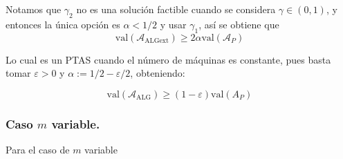 \documentclass[10pt]{article}
\newcommand{\val}[1]{\text{val}(#1)}
\theoremstyle{plain}
\theoremstyle{definition}
\begin{document}
Notamos que $\gamma_2$ no es una solución factible cuando se considera $\gamma \in (0,1)$, y entonces la única opción es $\alpha < 1/2$ y usar $\gamma_1$, así se obtiene que
$$
\val{\mathcal{A}_{\text{ALGext}}} \geq 2\alpha \val{\mathcal{A}_P}
$$

Lo cual es un PTAS cuando el número de máquinas es constante, pues basta tomar $\varepsilon >0$ y $\alpha:= 1/2-\varepsilon/2$, obteniendo:

$$
\val{\mathcal{A}_{\text{ALG}}} \geq (1-\varepsilon)\val{A_P}
$$

\subsubsection*{Caso $m$ variable.}

Para el caso de $m$ variable
\end{document}
